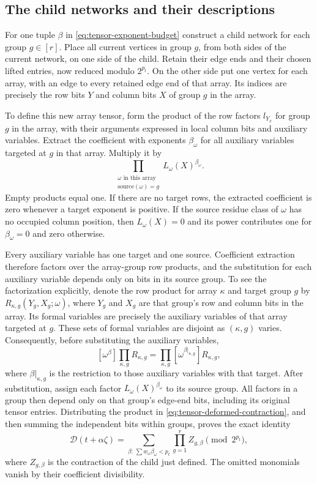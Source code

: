 \subsection{The child networks and their descriptions}
\label{subsec:tensor-children}

For one tuple $\beta$ in \eqref{eq:tensor-exponent-budget} construct
a child network for each group $g\in[r]$.
Place all current vertices in group $g$, from both sides of the
current network, on one side of the child.  Retain their edge ends and
their chosen lifted entries, now reduced modulo $2^{p_t}$.
On the other side put one vertex for each array, with an edge
to every retained edge end of that array.  Its indices are precisely
the row bits $Y$ and column bits $X$ of group $g$ in the array.

To define this new array tensor, form the product of the row
factors $l_{Y_x}$ for group $g$ in the array, with their arguments
expressed in local column bits and auxiliary variables.  Extract the
coefficient with exponents $\beta_{\omega}$ for all auxiliary variables targeted at
$g$ in that array.  Multiply it by
\[
 \prod_{\substack{{\omega}\text{ in this array}\\
                  \text{source}({\omega})=g}}L_{\omega}(X)^{\beta_{\omega}}.
\]
Empty products equal one. If there are no target rows, the extracted
coefficient is zero whenever a target exponent is positive. If the
source residue class of ${\omega}$ has no occupied column position, then $L_{\omega}(X)=0$ and its
power contributes one for $\beta_{\omega}=0$ and zero otherwise.

Every auxiliary variable has one target and one source.  Coefficient extraction
therefore factors over the array-group row products, and the
substitution for each auxiliary variable depends only on bits in its source
group. To see the factorization explicitly, denote the row product
for array $\kappa$ and target group $g$ by $R_{\kappa,g}(Y_g,X_g;{\omega})$,
where $Y_g$ and $X_g$ are that group's row and column bits in the array.
Its formal variables are precisely the auxiliary variables of that array
targeted at $g$. These sets of formal variables are disjoint as
$(\kappa,g)$ varies. Consequently, before substituting the auxiliary variables,
\[
 [{\omega}^\beta]\prod_{\kappa,g}R_{\kappa,g}
 =\prod_{\kappa,g}
    [{\omega}^{\beta|_{\kappa,g}}]R_{\kappa,g},
\]
where $\beta|_{\kappa,g}$ is the restriction to those auxiliary variables with that target.
After substitution, assign each factor $L_{\omega}(X)^{\beta_{\omega}}$ to
its source group. All factors in a group then depend only on
that group's edge-end bits, including its original tensor entries.
Distributing the product in
\eqref{eq:tensor-deformed-contraction}, and then summing the
independent bits within groups, proves the exact identity
\begin{equation}\label{eq:tensor-recursion-identity}
 \mathcal D(t+\alpha\zeta)
   =\sum_{\beta:\,\sum w_{\omega}\beta_{\omega}<p_t}
                       \prod_{g=1}^r Z_{g,\beta}
                  \pmod {2^{p_t}},
\end{equation}
where $Z_{g,\beta}$ is the contraction of the child just defined.
The omitted monomials vanish by their coefficient divisibility.

